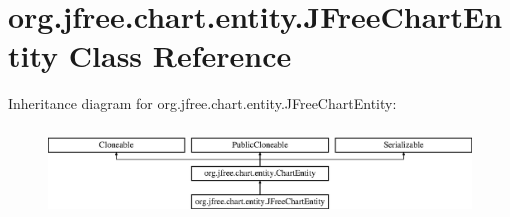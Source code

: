 \hypertarget{classorg_1_1jfree_1_1chart_1_1entity_1_1_j_free_chart_entity}{}\section{org.\+jfree.\+chart.\+entity.\+J\+Free\+Chart\+Entity Class Reference}
\label{classorg_1_1jfree_1_1chart_1_1entity_1_1_j_free_chart_entity}
Inheritance diagram for org.\+jfree.\+chart.\+entity.\+J\+Free\+Chart\+Entity\+:\begin{figure}[H]
\begin{center}
\leavevmode
\includegraphics[height=2.372881cm]{classorg_1_1jfree_1_1chart_1_1entity_1_1_j_free_chart_entity}
\end{center}
\end{figure}

